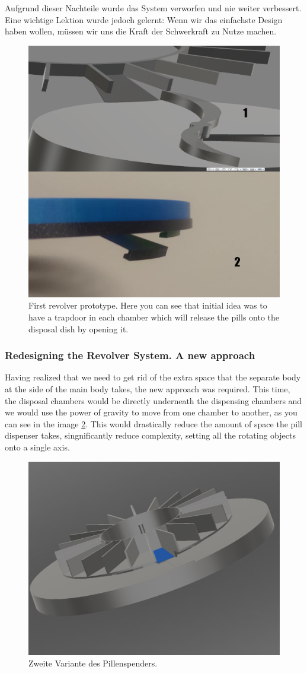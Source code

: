 Aufgrund dieser Nachteile wurde das System verworfen und nie weiter verbessert. Eine wichtige Lektion wurde jedoch gelernt: Wenn wir das einfachste Design haben wollen, müssen wir uns die Kraft der Schwerkraft zu Nutze machen.
\begin{figure}[h]
	\centering
	\includegraphics[width=0.7\linewidth]{Figures/Untitled-2}
	\caption[First revolver prototype]{First revolver prototype. Here you can see that initial idea was to have a trapdoor in each chamber which will release the pills onto the disposal dish by opening it.}
	\label{fig:screenshot1}
\end{figure}
\newpage
\subsubsection{Redesigning the Revolver System. A new approach}
Having realized that we need to get rid of the extra space that the separate body at the side of the main body takes, the new approach was required. This time, the disposal chambers would be directly underneath the dispensing chambers and we would use the power of gravity to move from one chamber to another, as you can see in the image \ref{fig:pspd2}. This would drastically reduce the amount of space the pill dispenser takes, singnificantly reduce complexity, setting all the rotating objects onto a single axis.


\begin{figure}[h]
	\centering
	\includegraphics[width=0.7\linewidth]{Figures/PSPD2}
	\caption[2 Variante des Pillenspenders.]{Zweite Variante des Pillenspenders.}
	\label{fig:pspd2}
\end{figure}

